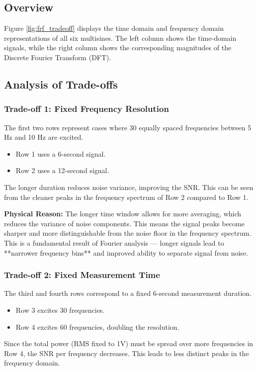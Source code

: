\documentclass[a4paper,12pt]{article}
\begin{document}
\subsection*{Overview}
Figure \ref{fig:frf_tradeoff} displays the time domain and frequency domain representations of all six multisines. The left column shows the time-domain signals, while the right column shows the corresponding magnitudes of the Discrete Fourier Transform (DFT).

\subsection*{Analysis of Trade-offs}

\subsubsection*{Trade-off 1: Fixed Frequency Resolution}
The first two rows represent cases where 30 equally spaced frequencies between 5 Hz and 10 Hz are excited.
\begin{itemize}
    \item Row 1 uses a 6-second signal.
    \item Row 2 uses a 12-second signal.
\end{itemize}
The longer duration reduces noise variance, improving the SNR. This can be seen from the cleaner peaks in the frequency spectrum of Row 2 compared to Row 1.

\textbf{Physical Reason:} 
The longer time window allows for more averaging, which reduces the variance of noise components. This means the signal peaks become sharper and more distinguishable from the noise floor in the frequency spectrum. This is a fundamental result of Fourier analysis — longer signals lead to **narrower frequency bins** and improved ability to separate signal from noise.

\subsubsection*{Trade-off 2: Fixed Measurement Time}
The third and fourth rows correspond to a fixed 6-second measurement duration.
\begin{itemize}
    \item Row 3 excites 30 frequencies.
    \item Row 4 excites 60 frequencies, doubling the resolution.
\end{itemize}
Since the total power (RMS fixed to 1V) must be spread over more frequencies in Row 4, the SNR per frequency decreases. This leads to less distinct peaks in the frequency domain.
\end{document}
